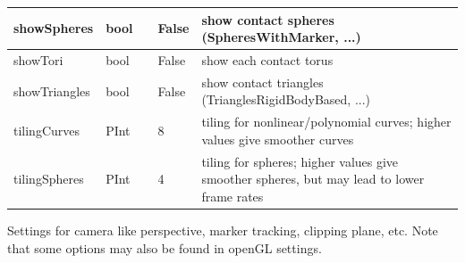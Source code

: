 \begin{center}
\begin{longtable}{| p{4.2cm} | p{2.5cm} | p{0.3cm} | p{3.0cm} | p{6cm} |}
    showSpheres &     bool &      &     False &     show contact spheres (SpheresWithMarker, ...)\\ \hline
    showTori &     bool &      &     False &     show each contact torus\\ \hline
    showTriangles &     bool &      &     False &     show contact triangles (TrianglesRigidBodyBased, ...)\\ \hline
    tilingCurves &     PInt &      &     8 &     tiling for nonlinear/polynomial curves; higher values give smoother curves\\ \hline
    tilingSpheres &     PInt &      &     4 &     tiling for spheres; higher values give smoother spheres, but may lead to lower frame rates\\ \hline
	  \end{longtable}
	\end{center}



\label{sec:VSettingsCamera}
Settings for camera like perspective, marker tracking, clipping plane, etc. Note that some options may also be found in openGL settings.

